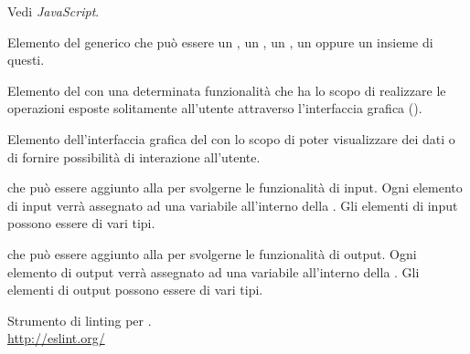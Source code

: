 Vedi \textit{JavaScript}.

Elemento del  generico che può essere un , un , un , un  oppure un insieme di questi.

Elemento del  con una determinata funzionalità che ha lo scopo di realizzare le operazioni esposte solitamente all'utente attraverso l’interfaccia grafica ().

Elemento dell’interfaccia grafica del  con lo scopo di poter visualizzare dei dati o di fornire possibilità di interazione all’utente.

 che può essere aggiunto alla  per svolgerne le funzionalit\`a di input. Ogni elemento di input verr\`a assegnato ad una variabile all’interno della . Gli elementi di input possono essere di vari tipi.

 che può essere aggiunto alla  per svolgerne le funzionalit\`a di output. Ogni elemento di output verr\`a assegnato ad una variabile all’interno della . Gli elementi di output possono essere di vari tipi.

Strumento di linting per .\\
\url{http://eslint.org/}
\clearpage